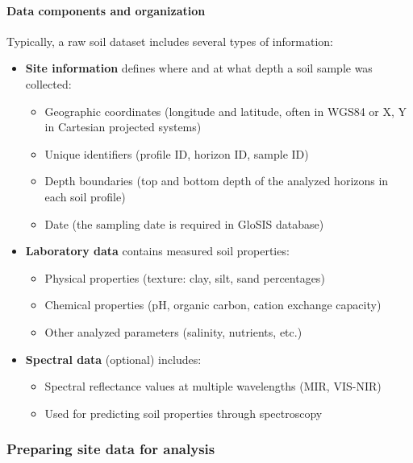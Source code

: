 \documentclass[
  10pt,
  b5paper,
  oneside]{book}
\providecommand{\tightlist}{%
  \setlength{\itemsep}{0pt}\setlength{\parskip}{0pt}}
\begin{document}
\paragraph*{Data components and organization}\label{data-components-and-organization}

Typically, a raw soil dataset includes several types of information:

\begin{itemize}
\tightlist
\item
  \textbf{Site information} defines where and at what depth a soil sample was collected:

  \begin{itemize}
  \tightlist
  \item
    Geographic coordinates (longitude and latitude, often in WGS84 or X, Y in Cartesian projected systems)
  \item
    Unique identifiers (profile ID, horizon ID, sample ID)
  \item
    Depth boundaries (top and bottom depth of the analyzed horizons in each soil profile)
  \item
    Date (the sampling date is required in GloSIS database)
  \end{itemize}
\item
  \textbf{Laboratory data} contains measured soil properties:

  \begin{itemize}
  \tightlist
  \item
    Physical properties (texture: clay, silt, sand percentages)
  \item
    Chemical properties (pH, organic carbon, cation exchange capacity)
  \item
    Other analyzed parameters (salinity, nutrients, etc.)
  \end{itemize}
\item
  \textbf{Spectral data} (optional) includes:

  \begin{itemize}
  \tightlist
  \item
    Spectral reflectance values at multiple wavelengths (MIR, VIS-NIR)
  \item
    Used for predicting soil properties through spectroscopy
  \end{itemize}
\end{itemize}

\subsubsection{Preparing site data for analysis}\label{preparing-site-data-for-analysis}
\end{document}
